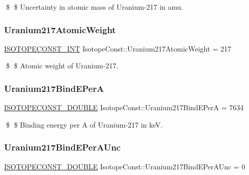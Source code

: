 \$ \$ Uncertainty in atomic mass of Uranium-\/217 in amu. \mbox{\label{group___isotope_const-_uranium-_u217_ga0b31c633291e0535fc702e4eb8455227}} 
\subsubsection{\texorpdfstring{Uranium217\+Atomic\+Weight}{Uranium217AtomicWeight}}
{\footnotesize\ttfamily \mbox{\hyperlink{group___isotope_const-_macros_ga5f18360b3e99483a35c32d789e62621c}{I\+S\+O\+T\+O\+P\+E\+C\+O\+N\+S\+T\+\_\+\+I\+NT}} Isotope\+Const\+::\+Uranium217\+Atomic\+Weight = 217}

\$ \$ Atomic weight of Uranium-\/217. \mbox{\label{group___isotope_const-_uranium-_u217_ga9fdb2e656c5533fa170a99ac476c248b}} 
\subsubsection{\texorpdfstring{Uranium217\+Bind\+E\+PerA}{Uranium217BindEPerA}}
{\footnotesize\ttfamily \mbox{\hyperlink{group___isotope_const-_macros_ga8f45a7272ce02c0b4c65c44636ed719a}{I\+S\+O\+T\+O\+P\+E\+C\+O\+N\+S\+T\+\_\+\+D\+O\+U\+B\+LE}} Isotope\+Const\+::\+Uranium217\+Bind\+E\+PerA = 7634}

\$ \$ Binding energy per A of Uranium-\/217 in keV. \mbox{\label{group___isotope_const-_uranium-_u217_ga0ec91581c695efe11d96b7e2ecac8c86}} 
\subsubsection{\texorpdfstring{Uranium217\+Bind\+E\+Per\+A\+Unc}{Uranium217BindEPerAUnc}}
{\footnotesize\ttfamily \mbox{\hyperlink{group___isotope_const-_macros_ga8f45a7272ce02c0b4c65c44636ed719a}{I\+S\+O\+T\+O\+P\+E\+C\+O\+N\+S\+T\+\_\+\+D\+O\+U\+B\+LE}} Isotope\+Const\+::\+Uranium217\+Bind\+E\+Per\+A\+Unc = 0}

